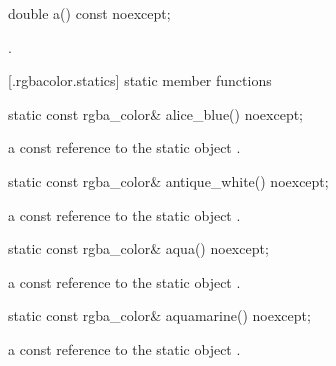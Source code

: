 \begin{itemdecl}
	double a() const noexcept;
\end{itemdecl}
\begin{itemdescr}
	\pnum
	\returns
	.
\end{itemdescr}

 [\iotwod.rgbacolor.statics] { static member functions}

\begin{itemdecl}
    static const rgba_color& alice_blue() noexcept;
\end{itemdecl}
\begin{itemdescr}
    \pnum
    \returns
    a const reference to the static  object .
\end{itemdescr}

\begin{itemdecl}
    static const rgba_color& antique_white() noexcept;
\end{itemdecl}
\begin{itemdescr}
    \pnum
    \returns
    a const reference to the static  object .
\end{itemdescr}

\begin{itemdecl}
    static const rgba_color& aqua() noexcept;
\end{itemdecl}
\begin{itemdescr}
    \pnum
    \returns
    a const reference to the static  object .
\end{itemdescr}

\begin{itemdecl}
    static const rgba_color& aquamarine() noexcept;
\end{itemdecl}
\begin{itemdescr}
    \pnum
    \returns
    a const reference to the static  object .
\end{itemdescr}

